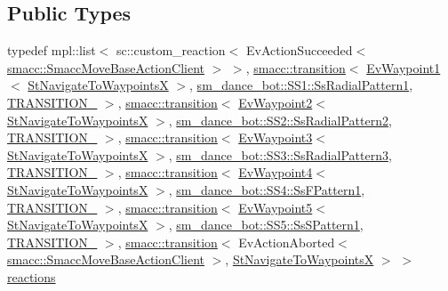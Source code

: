 \subsection*{Public Types}
\begin{DoxyCompactItemize}
\item 
typedef mpl\+::list$<$ sc\+::custom\+\_\+reaction$<$ Ev\+Action\+Succeeded$<$ \hyperlink{classsmacc_1_1SmaccMoveBaseActionClient}{smacc\+::\+Smacc\+Move\+Base\+Action\+Client} $>$ $>$, \hyperlink{classsmacc_1_1transition}{smacc\+::transition}$<$ \hyperlink{structsm__dance__bot_1_1EvWaypoint1}{Ev\+Waypoint1}$<$ \hyperlink{structsm__dance__bot_1_1StNavigateToWaypointsX}{St\+Navigate\+To\+WaypointsX} $>$, \hyperlink{structsm__dance__bot_1_1SS1_1_1SsRadialPattern1}{sm\+\_\+dance\+\_\+bot\+::\+S\+S1\+::\+Ss\+Radial\+Pattern1}, \hyperlink{structsm__dance__bot_1_1StNavigateToWaypointsX_1_1TRANSITION__1}{T\+R\+A\+N\+S\+I\+T\+I\+O\+N\+\_} $>$, \hyperlink{classsmacc_1_1transition}{smacc\+::transition}$<$ \hyperlink{structsm__dance__bot_1_1EvWaypoint2}{Ev\+Waypoint2}$<$ \hyperlink{structsm__dance__bot_1_1StNavigateToWaypointsX}{St\+Navigate\+To\+WaypointsX} $>$, \hyperlink{structsm__dance__bot_1_1SS2_1_1SsRadialPattern2}{sm\+\_\+dance\+\_\+bot\+::\+S\+S2\+::\+Ss\+Radial\+Pattern2}, \hyperlink{structsm__dance__bot_1_1StNavigateToWaypointsX_1_1TRANSITION__2}{T\+R\+A\+N\+S\+I\+T\+I\+O\+N\+\_} $>$, \hyperlink{classsmacc_1_1transition}{smacc\+::transition}$<$ \hyperlink{structsm__dance__bot_1_1EvWaypoint3}{Ev\+Waypoint3}$<$ \hyperlink{structsm__dance__bot_1_1StNavigateToWaypointsX}{St\+Navigate\+To\+WaypointsX} $>$, \hyperlink{structsm__dance__bot_1_1SS3_1_1SsRadialPattern3}{sm\+\_\+dance\+\_\+bot\+::\+S\+S3\+::\+Ss\+Radial\+Pattern3}, \hyperlink{structsm__dance__bot_1_1StNavigateToWaypointsX_1_1TRANSITION__3}{T\+R\+A\+N\+S\+I\+T\+I\+O\+N\+\_} $>$, \hyperlink{classsmacc_1_1transition}{smacc\+::transition}$<$ \hyperlink{structsm__dance__bot_1_1EvWaypoint4}{Ev\+Waypoint4}$<$ \hyperlink{structsm__dance__bot_1_1StNavigateToWaypointsX}{St\+Navigate\+To\+WaypointsX} $>$, \hyperlink{structsm__dance__bot_1_1SS4_1_1SsFPattern1}{sm\+\_\+dance\+\_\+bot\+::\+S\+S4\+::\+Ss\+F\+Pattern1}, \hyperlink{structsm__dance__bot_1_1StNavigateToWaypointsX_1_1TRANSITION__4}{T\+R\+A\+N\+S\+I\+T\+I\+O\+N\+\_} $>$, \hyperlink{classsmacc_1_1transition}{smacc\+::transition}$<$ \hyperlink{structsm__dance__bot_1_1EvWaypoint5}{Ev\+Waypoint5}$<$ \hyperlink{structsm__dance__bot_1_1StNavigateToWaypointsX}{St\+Navigate\+To\+WaypointsX} $>$, \hyperlink{structsm__dance__bot_1_1SS5_1_1SsSPattern1}{sm\+\_\+dance\+\_\+bot\+::\+S\+S5\+::\+Ss\+S\+Pattern1}, \hyperlink{structsm__dance__bot_1_1StNavigateToWaypointsX_1_1TRANSITION__5}{T\+R\+A\+N\+S\+I\+T\+I\+O\+N\+\_} $>$, \hyperlink{classsmacc_1_1transition}{smacc\+::transition}$<$ Ev\+Action\+Aborted$<$ \hyperlink{classsmacc_1_1SmaccMoveBaseActionClient}{smacc\+::\+Smacc\+Move\+Base\+Action\+Client} $>$, \hyperlink{structsm__dance__bot_1_1StNavigateToWaypointsX}{St\+Navigate\+To\+WaypointsX} $>$ $>$ \hyperlink{structsm__dance__bot_1_1StNavigateToWaypointsX_a3d82013d24b5d23b26822298d1a959f9}{reactions}
\end{DoxyCompactItemize}
